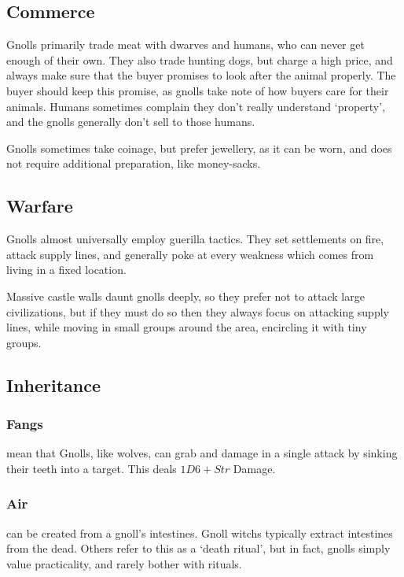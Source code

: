 \begin{multicols}{2}
\subsection{Commerce}

Gnolls primarily trade meat with dwarves and humans, who can never get enough of their own.
They also trade hunting dogs, but charge a high price, and always make sure that the buyer promises to look after the animal properly.
The buyer should keep this promise, as gnolls take note of how buyers care for their animals.
Humans sometimes complain they don't really understand `property', and the gnolls generally don't sell to those humans.

Gnolls sometimes take coinage, but prefer jewellery, as it can be worn, and does not require additional preparation, like money-sacks.

\subsection{Warfare}

Gnolls almost universally employ guerilla tactics.
They set settlements on fire, attack supply lines, and generally poke at every weakness which comes from living in a fixed location.

Massive castle walls daunt gnolls deeply, so they prefer not to attack large civilizations, but if they must do so then they always focus on attacking supply lines, while moving in small groups around the area, encircling it with tiny groups.

\subsection{Inheritance}

\subsubsection[Teeth: grab and grapple in a single manoeuvre]{Fangs}
\label{gnollishInheritance}
mean that Gnolls, like wolves, can grab and damage in a single attack by sinking their teeth into a target.
This deals $1D6 + Str$ Damage.

\subsubsection{Air }
can be created from a gnoll's intestines.
Gnoll \glspl{witch} typically extract intestines from the dead.
Others refer to this as a `death ritual', but in fact, gnolls simply value practicality, and rarely bother with rituals.


\end{multicols}
